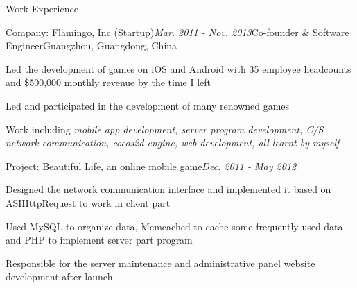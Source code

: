 \documentclass{resume} %
\begin{document}
\begin{rSection}{Work Experience}

\begin{rSubsection}{Company: Flamingo, Inc (Startup)}{\em Mar. 2011 - Nov. 2013}{Co-founder \& Software Engineer}{Guangzhou, Guangdong, China}
\item Led the development of games on iOS and Android with 35 employee headcounts and \$500,000 monthly revenue by the time I left
\item Led and participated in the development of many renowned games
\item Work including \textit{mobile app development, server program development, C/S network communication, cocos2d engine, web development, all learnt by myself}
\end{rSubsection}


\begin{rSubsection}{Project: Beautiful Life, an online mobile game}{\em Dec. 2011 - May 2012}{}{}
\item Designed the network communication interface and implemented it based on ASIHttpRequest to work in client part
\item Used MySQL to organize data, Memcached to cache some frequently-used data and PHP to implement server part program
\item Responsible for the server maintenance and administrative panel website development after launch
\end{rSubsection}


\end{rSection}
\end{document}
